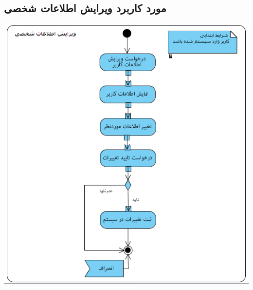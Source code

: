 \documentclass{article}
\begin{document}
\newpage
\vspace{2cm}
\subsection*{مورد کاربرد ویرایش اطلاعات شخصی}
\vspace{2cm}
\begin{center}
\includegraphics[width=\textwidth]{ActivityDiagrams/11.png}
\end{center}

\newpage
\vspace{2cm}
\end{document}
